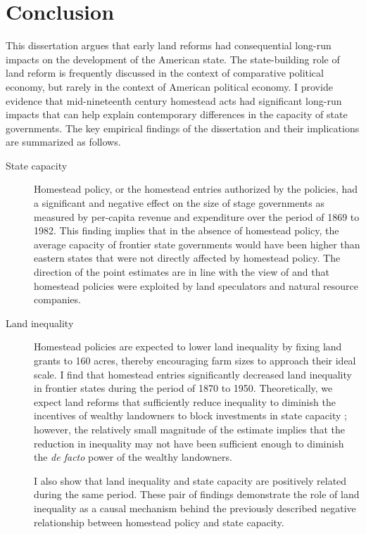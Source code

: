 \chapter{Conclusion}

This dissertation argues that early land reforms had consequential long-run impacts on the development of the American state. The state-building role of land reform is frequently discussed in the context of comparative political economy, but rarely in the context of American political economy. I provide evidence that mid-nineteenth century homestead acts had significant long-run impacts that can help explain contemporary differences in the capacity of state governments. The key empirical findings of the dissertation and their implications are summarized as follows.

\begin{description}
	\item[State capacity] Homestead policy, or the homestead entries authorized by the policies, had a significant and negative effect on the size of stage governments as measured by per-capita revenue and expenditure over the period of 1869 to 1982. This finding implies that in the absence of homestead policy, the average capacity of frontier state governments would have been higher than eastern states that were not directly affected by homestead policy. The direction of the point estimates are in line with the view of \citet{gates1968history} and \citet{murtazashvili2013political} that homestead policies were exploited by land speculators and natural resource companies. 
	\item[Land inequality] Homestead policies are expected to lower land inequality by fixing land grants to 160 acres, thereby encouraging farm sizes to approach their ideal scale. I find that homestead entries significantly decreased land inequality in frontier states during the period of 1870 to 1950. Theoretically, we expect land reforms that sufficiently reduce inequality to diminish the incentives of wealthy landowners to block investments in state capacity \citep{besley2009origins,galor2009inequality}; however, the relatively small magnitude of the estimate implies that the reduction in inequality may not have been sufficient enough to diminish the \emph{de facto} power of the wealthy landowners. 
	
	I also show that land inequality and state capacity are positively related during the same period. These pair of findings demonstrate the role of land inequality as a causal mechanism behind the previously described negative relationship between homestead policy and state capacity. 
	

\end{description}
